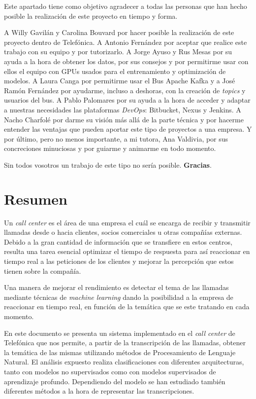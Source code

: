 Este apartado tiene como objetivo agradecer a todas las personas que han hecho posible la realización de este proyecto en tiempo y forma.


A Willy Gavilán y Carolina Bouvard por hacer posible la  realización de este proyecto dentro de Telefónica. A Antonio Fernández por aceptar que realice este trabajo con su equipo y por tutorizarlo. A Jorge Ayuso y Rus Mesas por su ayuda a la hora de obtener los datos, por sus consejos y por permitirme usar con ellos el equipo con GPUs usados para  el entrenamiento y optimización de modelos. A Laura Canga por permitirme usar el Bus Apache Kafka y a José Ramón Fernández por ayudarme, incluso a deshoras, con la creación de \textit{topics} y usuarios del bus.  A Pablo Palomares por su ayuda a la hora de acceder y adaptar a nuestras necesidades las plataformas \textit{DevOps}: Bitbucket, Nexus y Jenkins. A Nacho Charfolé por darme su visión más allá de la parte técnica y por hacerme entender las ventajas que pueden aportar este tipo de proyectos a una empresa. Y por último, pero no menos importante, a mi tutora, Ana Valdivia, por sus concreciones minuciosas y por guiarme y animarme en todo momento.

Sin todos vosotros un trabajo de este tipo no sería posible. \textbf{{\LARGE Gracias}}.


\chapter*{Resumen}


Un \textit{call center} es el área de una empresa el cuál se encarga de recibir y transmitir llamadas desde o hacia clientes, socios comerciales u otras compañías externas. Debido a la gran cantidad de información que se transfiere en estos centros, resulta una tarea esencial optimizar el tiempo de respuesta para así reaccionar en tiempo real a las peticiones de los clientes y mejorar la percepción que estos tienen sobre la compañía. 

Una manera de mejorar el rendimiento es detectar el tema de las llamadas  mediante técnicas de \textit{machine learning} dando la posibilidad a la empresa de reaccionar en tiempo real, en función de la temática que se este tratando en cada momento. 

En este documento se presenta un sistema implementado en el \textit{call center} de Telefónica que nos 
 permite, a partir de la transcripción de las llamadas, obtener la temática de las mismas utilizando métodos de Procesamiento de Lenguaje Natural. El análisis expuesto realiza clasificaciones con diferentes arquitecturas, tanto con modelos no supervisados como con modelos supervisados de aprendizaje profundo. Dependiendo del modelo se han estudiado también diferentes métodos a la hora de representar las transcripciones.
 
